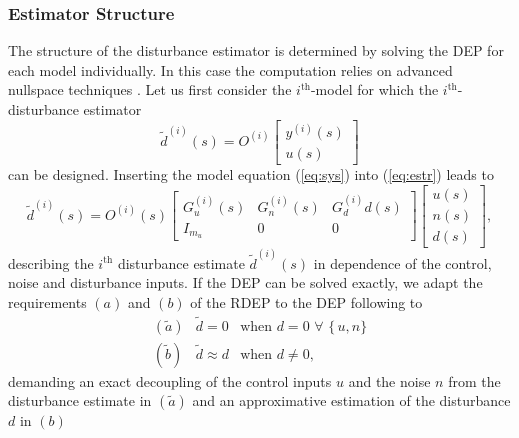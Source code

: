 \documentclass[graybox]{svmult}
\begin{document}
\subsubsection{Estimator Structure}\label{sec:strc}
The structure of the disturbance estimator is determined by solving the DEP \cite{Ossmann18ccta} for each model individually. In this case the computation relies on advanced nullspace techniques \cite{}. Let us first consider the $i^{\text{th}}$-model  for which the  $i^{\text{th}}$- disturbance  estimator 
\begin{equation}\label{eq:estr}
\tilde d^{(i)}(s) =  O^{(i)}
\begin{bmatrix}
y^{(i)}(s) \\ u(s)
\end{bmatrix}
\end{equation}
can be designed.
Inserting the  model equation (\ref{eq:sys})  into (\ref{eq:estr}) leads to
\begin{equation}\label{eq:full}
\tilde d^{(i)}(s) = O^{(i)}(s) 
\begin{bmatrix}
G_u^{(i)}(s) & G_{n}^{(i)}(s) & G_d^{(i)}d(s) \\ I_{m_u}& 0 & 0
\end{bmatrix}
\begin{bmatrix}
u(s) \\ n(s) \\ d(s)
\end{bmatrix},
\end{equation}
describing the  $i^{\text{th}}$ disturbance estimate $\tilde d^{(i)}(s)$ in dependence of the control, noise and disturbance inputs.  If the DEP can be solved exactly, we adapt the requirements $(a)$ and $(b)$ of the RDEP to the DEP following \cite{Ossmann18ccta} to
\begin{equation}
\begin{array}{lll}
(\tilde a) & \tilde d = 0 & \text{when } d = 0  \,\, \forall  \,\, \{\, u, n \}\\ 
(\tilde b) &\tilde d \approx d & \text{when } d \neq 0, 
\end{array}
\end{equation}
demanding an exact decoupling of the control inputs $u$ and the noise $n$ from the disturbance estimate in $(\tilde a)$ and an approximative estimation of the disturbance $d$ in $(b)$ 
\end{document}
